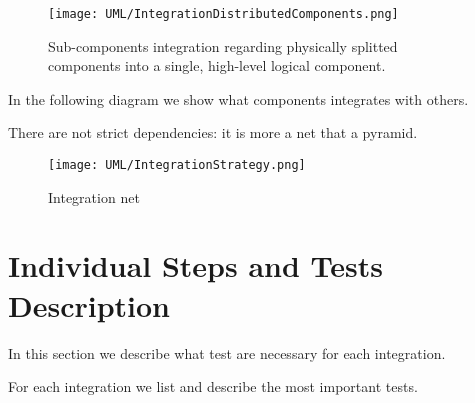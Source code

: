 \documentclass[11pt]{article} %
\begin{document}
\begin{figure}[H]
	\centering
	\texttt{[image: UML/IntegrationDistributedComponents.png]}
	\caption{Sub-components integration regarding physically splitted components into a single, high-level logical component.}
\end{figure}	

In the following diagram we show what components integrates with others.

There are not strict dependencies: it is more a net that a pyramid.

\begin{figure}[H]
	\centering
	\texttt{[image: UML/IntegrationStrategy.png]}
	\caption{Integration net}
\end{figure}	


\newpage
\section{Individual Steps and Tests Description}

In this section we describe what test are necessary for each integration.

For each integration we list and describe the most important tests.
\end{document}
